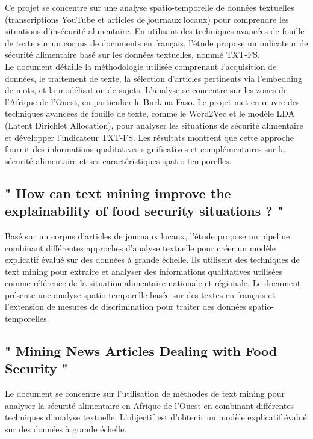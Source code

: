 \documentclass{article}
\begin{document}
Ce projet se concentre sur une analyse spatio-temporelle de données textuelles (transcriptions YouTube et articles de journaux locaux) pour comprendre les situations d'insécurité alimentaire. En utilisant des techniques avancées de fouille de texte sur un corpus de documents en français, l'étude propose un indicateur de sécurité alimentaire basé sur les données textuelles, nommé TXT-FS. \\

Le document détaille la méthodologie utilisée comprenant l'acquisition de données, le traitement de texte, la sélection d'articles pertinents via l'embedding de mots, et la modélisation de sujets. L'analyse se concentre sur les zones de l'Afrique de l'Ouest, en particulier le Burkina Faso. Le projet met en œuvre des techniques avancées de fouille de texte, comme le Word2Vec et le modèle LDA (Latent Dirichlet Allocation), pour analyser les situations de sécurité alimentaire et développer l'indicateur TXT-FS. Les résultats montrent que cette approche fournit des informations qualitatives significatives et complémentaires sur la sécurité alimentaire et ses caractéristiques spatio-temporelles. 

\subsection{" How can text mining improve the explainability of food security situations ? "}

Basé sur un corpus d'articles de journaux locaux, l'étude propose un pipeline combinant différentes approches d'analyse textuelle pour créer un modèle explicatif évalué sur des données à grande échelle. Ils utilisent des techniques de text mining pour extraire et analyser des informations qualitatives utilisées comme référence de la situation alimentaire nationale et régionale. Le document présente une analyse spatio-temporelle basée sur des textes en français et l'extension de mesures de discrimination pour traiter des données spatio-temporelles.

\subsection{" Mining News Articles Dealing with Food Security "}

Le document se concentre sur l'utilisation de méthodes de text mining pour analyser la sécurité alimentaire en Afrique de l'Ouest en combinant différentes techniques d'analyse textuelle. L'objectif est d'obtenir un modèle explicatif évalué sur des données à grande échelle. \\
\end{document}
